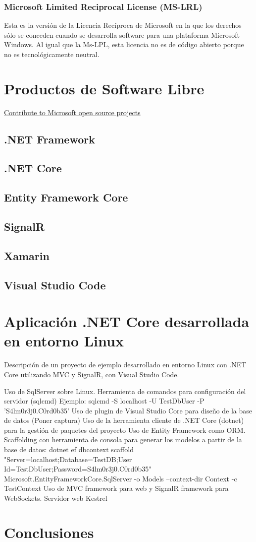 \documentclass[10pt, titlepage]{article}
\begin{document}
\subsubsection{Microsoft Limited Reciprocal License (MS-LRL)}
Esta es la versión de la Licencia Recíproca de Microsoft en la que los derechos sólo se conceden cuando se desarrolla software para una plataforma Microsoft Windows. Al igual que la Ms-LPL, esta licencia no es de código abierto porque no es tecnológicamente neutral.
\section{Productos de Software Libre}
\href{https://opensource.microsoft.com/explore}{Contribute to Microsoft open source projects}
\subsection{.NET Framework}
\subsection{.NET Core}
\subsection{Entity Framework Core}
\subsection{SignalR}
\subsection{Xamarin}
\subsection{Visual Studio Code}

\section{Aplicación .NET Core desarrollada en entorno Linux}
Descripción de un proyecto de ejemplo desarrollado en entorno Linux con .NET Core utilizando MVC y SignalR, con Visual Studio Code.

Uso de SqlServer sobre Linux. Herramienta de comandos para configuración del servidor (sqlcmd)
Ejemplo: sqlcmd -S localhost -U TestDbUser -P 'S4lm0r3j0.C0rd0b35'
Uso de plugin de Visual Studio Core para diseño de la base de datos (Poner captura)
Uso de la herramienta cliente de .NET Core (dotnet) para la gestión de paquetes del proyecto
Uso de Entity Framework como ORM. Scaffolding con herramienta de consola para generar los modelos a partir de la base de datos: dotnet ef dbcontext scaffold "Server=localhost;Database=TestDB;User Id=TestDbUser;Password=S4lm0r3j0.C0rd0b35" Microsoft.EntityFrameworkCore.SqlServer -o Models --context-dir Context -c TestContext
Uso de MVC framework para web y SignalR framework para WebSockets.
Servidor web Kestrel

\section{Conclusiones}

\clearpage


\end{document}

